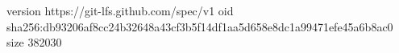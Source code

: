 version https://git-lfs.github.com/spec/v1
oid sha256:db93206af8cc24b32648a43cf3b5f14df1aa5d658e8dc1a99471efe45a6b8ac0
size 382030

